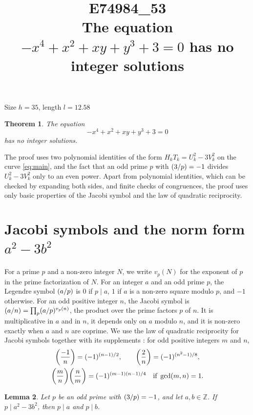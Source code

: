 \documentclass[11pt]{article}
\title{\textbf{E74984\_53}\\[4pt] {\Large The equation $-x^{4}+x^{2}+xy+y^{3}+3=0$ has no integer solutions}}
\author{}
\date{}
\newtheorem{theorem}{Theorem}
\newtheorem{lemma}[theorem]{Lemma}
\newcommand{\Z}{\mathbb{Z}}
\newcommand{\leg}[2]{\mathchoice{\biggl(\dfrac{#1}{#2}\biggr)}{(#1/#2)}{(#1/#2)}{(#1/#2)}}
\begin{document}
\maketitle
\vspace{-8ex}
\begin{center}
Size $h=35$, length $l=12.58$
\end{center}

\begin{theorem}\label{thm:main}
The equation
\begin{equation}\label{eq:main}
-x^{4}+x^{2}+xy+y^{3}+3=0
\end{equation}
has no integer solutions.
\end{theorem}

The proof uses two polynomial identities of the form $H_kT_k=U_k^2-3V_k^2$ on the curve \eqref{eq:main}, and the fact that an odd prime $p$ with $\leg{3}{p}=-1$ divides $U_k^2-3V_k^2$ only to an even power. Apart from polynomial identities, which can be checked by expanding both sides, and finite checks of congruences, the proof uses only basic properties of the Jacobi symbol and the law of quadratic reciprocity.

\section{\texorpdfstring{Jacobi symbols and the norm form $a^2-3b^2$}{Jacobi symbols and the norm form}}

For a prime $p$ and a non-zero integer $N$, we write $v_p(N)$ for the exponent of $p$ in the prime factorization of $N$. For an integer $a$ and an odd prime $p$, the Legendre symbol $\leg{a}{p}$ is $0$ if $p\mid a$, $1$ if $a$ is a non-zero square modulo $p$, and $-1$ otherwise. For an odd positive integer $n$, the Jacobi symbol is $\leg{a}{n}=\prod_p\leg{a}{p}^{v_p(n)}$, the product over the prime factors $p$ of $n$. It is multiplicative in $a$ and in $n$, it depends only on $a$ modulo $n$, and it is non-zero exactly when $a$ and $n$ are coprime. We use the law of quadratic reciprocity for Jacobi symbols together with its supplements \cite[Chapter~5, \S2]{IR}: for odd positive integers $m$ and $n$,
\begin{gather*}
\leg{-1}{n}=(-1)^{(n-1)/2},\qquad\leg{2}{n}=(-1)^{(n^2-1)/8},\\
\leg{m}{n}\leg{n}{m}=(-1)^{(m-1)(n-1)/4}\quad\text{if }\gcd(m,n)=1.
\end{gather*}

\begin{lemma}\label{lem:divides}
Let $p$ be an odd prime with $\leg{3}{p}=-1$, and let $a,b\in\Z$. If $p\mid a^2-3b^2$, then $p\mid a$ and $p\mid b$.
\end{lemma}
\end{document}
